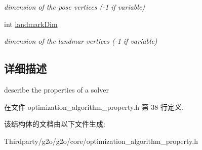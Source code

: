 \begin{DoxyCompactItemize}
\begin{DoxyCompactList}\small\item\em dimension of the pose vertices (-\/1 if variable) \end{DoxyCompactList}\item 
\hypertarget{structg2o_1_1OptimizationAlgorithmProperty_ad946dec26df70a6fb6d99f2ab76db269}{int \hyperlink{structg2o_1_1OptimizationAlgorithmProperty_ad946dec26df70a6fb6d99f2ab76db269}{landmark\-Dim}}\label{structg2o_1_1OptimizationAlgorithmProperty_ad946dec26df70a6fb6d99f2ab76db269}

\begin{DoxyCompactList}\small\item\em dimension of the landmar vertices (-\/1 if variable) \end{DoxyCompactList}\end{DoxyCompactItemize}


\subsection{详细描述}
describe the properties of a solver 

在文件 optimization\-\_\-algorithm\-\_\-property.\-h 第 38 行定义.



该结构体的文档由以下文件生成\-:\begin{DoxyCompactItemize}
\item 
Thirdparty/g2o/g2o/core/optimization\-\_\-algorithm\-\_\-property.\-h\end{DoxyCompactItemize}

